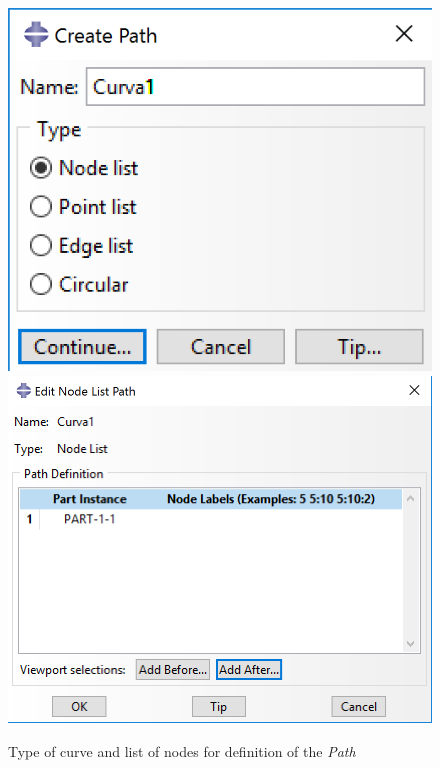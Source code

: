 \documentclass[english,a4paper,12pt]{article}
\begin{document}
\begin{enumerate}
\begin{figure}[h!tp]
    {\includegraphics[scale=0.45]{capturas2019/a_fig36a.png}}
    \quad
	{\includegraphics[scale=0.45]{capturas2019/a_fig36b.png}}
  \caption{Type of curve and list of nodes for definition of the \emph{Path}}
  \label{fig13}
\end{figure}


\end{enumerate}
\end{document}
